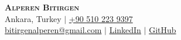 \begin{center}
    \begin{minipage}{0.75\textwidth}
        \centering
        \textbf{\Huge \scshape Alperen Bitirgen} \\ \vspace{6pt}
        \small
        \faMapMarker \hspace{.5pt} {Ankara, Turkey}
        $|$
        \faMobile \hspace{.5pt} \href{tel:905102239397}{+90 510 223 9397} \\
        \faAt \hspace{.5pt} \href{mailto:bitirgenalperen@gmail.com}{bitirgenalperen@gmail.com}
        $|$
        \faLinkedinSquare \hspace{.5pt} \href{https://www.linkedin.com/in/bitirgenalperen/}{LinkedIn}
        $|$
        \faGithub \hspace{.5pt} \href{https://github.com/bitirgenalperen}{GitHub}
    \end{minipage}
    \hfill
\end{center}